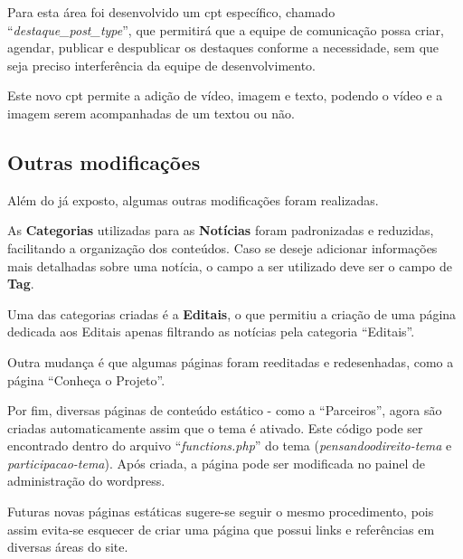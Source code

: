 Para esta área foi desenvolvido um \gls{cpt} específico, chamado ``\textit{destaque\_post\_type}'', que permitirá que a equipe de comunicação possa criar, agendar, publicar e despublicar os destaques conforme a necessidade, sem que seja preciso interferência da equipe de desenvolvimento.

Este novo \gls{cpt} permite a adição de vídeo, imagem e texto, podendo o vídeo e a imagem serem acompanhadas de um textou ou não.

\subsection{Outras modificações}
Além do já exposto, algumas outras modificações foram realizadas.

As \textbf{Categorias} utilizadas para as \textbf{Notícias} foram padronizadas e reduzidas, facilitando a organização dos conteúdos. Caso se deseje adicionar informações mais detalhadas sobre uma notícia, o campo a ser utilizado deve ser o campo de \textbf{Tag}.

Uma das categorias criadas é a \textbf{Editais}, o que permitiu a criação de uma página dedicada aos Editais apenas filtrando as notícias pela categoria ``Editais''.

Outra mudança é que algumas páginas foram reeditadas e redesenhadas, como a página ``Conheça o Projeto''.

Por fim, diversas páginas de conteúdo estático - como a ``Parceiros'', agora são criadas automaticamente assim que o tema é ativado. Este código pode ser encontrado dentro do arquivo ``\textit{functions.php}'' do tema (\textit{pensandoodireito-tema} e \textit{participacao-tema}). Após criada, a página pode ser modificada no painel de administração do wordpress.

Futuras novas páginas estáticas sugere-se seguir o mesmo procedimento, pois assim evita-se esquecer de criar uma página que possui links e referências em diversas áreas do site.